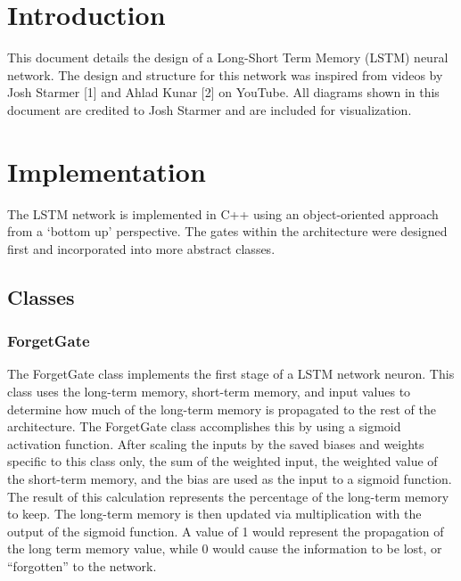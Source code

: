 \documentclass[12pt]{article}
\begin{document}
\onehalfspacing
\thispagestyle{fancy}
\fancyhf{}
\setlength{\headheight}{56.18335pt}

\section{Introduction}

This document details the design of a Long-Short Term Memory (LSTM) neural
network. The design and structure for this network was inspired from videos by
Josh Starmer [1] and Ahlad Kunar [2] on YouTube. All diagrams shown in this
document are credited to Josh Starmer and are included for visualization.


\section{Implementation}

The LSTM network is implemented in C++ using an object-oriented approach from a
`bottom up' perspective. The gates within the architecture were designed first
and incorporated into more abstract classes.

\subsection{Classes}

\subsubsection{ForgetGate}

The ForgetGate class implements the first stage of a LSTM network neuron. This
class uses the long-term memory, short-term memory, and input values to
determine how much of the long-term memory is propagated to the rest of the
architecture. The ForgetGate class accomplishes this by using a sigmoid
activation function. After scaling the inputs by the saved biases and weights
specific to this class only, the sum of the weighted input, the weighted value
of the short-term memory, and the bias are used as the input to a sigmoid
function. The result of this calculation represents the percentage of the
long-term memory to keep. The long-term memory is then updated via
multiplication with the output of the sigmoid function. A value of 1 would
represent the propagation of the long term memory value, while 0 would cause
the information to be lost, or ``forgotten'' to the network.
\end{document}
